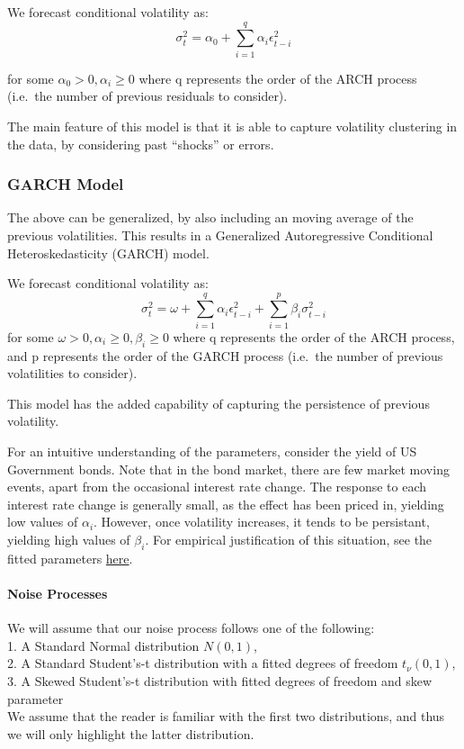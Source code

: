 \documentclass[11pt]{article}
\begin{document}
We forecast conditional volatility as:
\[\sigma^2_t = \alpha_0 + \sum_{i=1}^{q} {\alpha_i \epsilon^2_{t-i}}\]

for some \(\alpha_0 > 0, \alpha_i \geq 0\) where q represents the order
of the ARCH process (i.e.~the number of previous residuals to consider).

The main feature of this model is that it is able to capture volatility
clustering in the data, by considering past ``shocks'' or errors.

\subsubsection{GARCH Model}\label{garch-model}

The above can be generalized, by also including an moving average of the
previous volatilities. This results in a Generalized Autoregressive
Conditional Heteroskedasticity (GARCH) model.

We forecast conditional volatility as:
\[\sigma^2_t = \omega + \sum_{i=1}^{q} {\alpha_i \epsilon^2_{t-i}}+\sum_{i=1}^{p} {\beta_i \sigma^2_{t-i}} \]
for some \(\omega > 0, \alpha_i \geq 0, \beta_i \geq 0\) where q
represents the order of the ARCH process, and p represents the order of
the GARCH process (i.e.~the number of previous volatilities to
consider).

This model has the added capability of capturing the persistence of
previous volatility.

For an intuitive understanding of the parameters, consider the yield of
US Government bonds. Note that in the bond market, there are few market
moving events, apart from the occasional interest rate change. The
response to each interest rate change is generally small, as the effect
has been priced in, yielding low values of \(\alpha_i\). However, once
volatility increases, it tends to be persistant, yielding high values of
\(\beta_i\). For empirical justification of this situation, see the
fitted parameters \hyperref[fit-garch-models]{here}.

\paragraph{Noise Processes}\label{noise-processes}

We will assume that our noise process follows one of the following:\\
1. A Standard Normal distribution \(N(0,1)\),\\
2. A Standard Student's-t distribution with a fitted degrees of freedom
\(t_\nu (0,1)\),\\
3. A Skewed Student's-t distribution with fitted degrees of freedom and
skew parameter\\
We assume that the reader is familiar with the first two distributions,
and thus we will only highlight the latter distribution.
\end{document}
